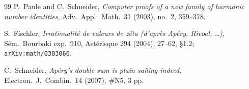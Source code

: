 \begin{thebibliography}{99}
P.~Paule and C.~Schneider,
\emph{Computer proofs of a new family of harmonic number identities},
Adv.\ Appl.\ Math.\ 31 (2003), no.~2, 359--378.

S.~Fischler,
\emph{Irrationalit\'e de valeurs de z\^eta (d'apr\`es Ap\'ery, Rivoal, \dots)},
S\'em.\ Bourbaki exp.\ 910, Ast\'erisque 294 (2004), 27--62, \S1.2;
\texttt{arXiv:math/0303066}.

C.~Schneider,
\emph{Ap\'ery's double sum is plain sailing indeed},
Electron.\ J.\ Combin.\ 14 (2007), \#N5, 3 pp.

\end{thebibliography}
